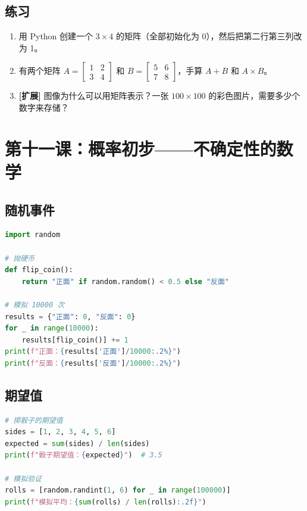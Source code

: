 \documentclass[a4paper,12pt]{ctexart}
\begin{document}
\subsection*{练习}

\begin{enumerate}
  \item 用 Python 创建一个 $3 \times 4$ 的矩阵（全部初始化为 0），然后把第二行第三列改为 1。
  \item 有两个矩阵 $A = \begin{bmatrix} 1 & 2 \\ 3 & 4 \end{bmatrix}$ 和 $B = \begin{bmatrix} 5 & 6 \\ 7 & 8 \end{bmatrix}$，手算 $A + B$ 和 $A \times B$。
  \item \textbf{[扩展]} 图像为什么可以用矩阵表示？一张 $100 \times 100$ 的彩色图片，需要多少个数字来存储？
\end{enumerate}

\section*{第十一课：概率初步——不确定性的数学}

\subsection*{随机事件}

\begin{lstlisting}[language=Python]
import random

# 抛硬币
def flip_coin():
    return "正面" if random.random() < 0.5 else "反面"

# 模拟 10000 次
results = {"正面": 0, "反面": 0}
for _ in range(10000):
    results[flip_coin()] += 1
print(f"正面：{results['正面']/10000:.2%}")
print(f"反面：{results['反面']/10000:.2%}")
\end{lstlisting}

\subsection*{期望值}

\begin{lstlisting}[language=Python]
# 掷骰子的期望值
sides = [1, 2, 3, 4, 5, 6]
expected = sum(sides) / len(sides)
print(f"骰子期望值：{expected}")  # 3.5

# 模拟验证
rolls = [random.randint(1, 6) for _ in range(100000)]
print(f"模拟平均：{sum(rolls) / len(rolls):.2f}")
\end{lstlisting}
\end{document}

